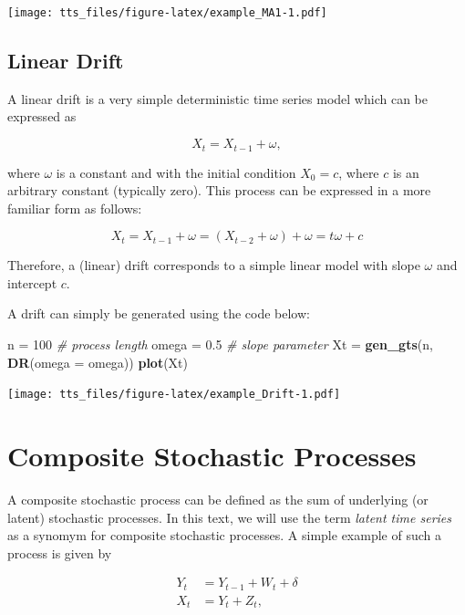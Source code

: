 \documentclass[]{book}
\newenvironment{Shaded}{\begin{snugshade}}{\end{snugshade}}
\newcommand{\CommentTok}[1]{\textcolor[rgb]{0.56,0.35,0.01}{\textit{#1}}}
\newcommand{\DataTypeTok}[1]{\textcolor[rgb]{0.13,0.29,0.53}{#1}}
\newcommand{\DecValTok}[1]{\textcolor[rgb]{0.00,0.00,0.81}{#1}}
\newcommand{\FloatTok}[1]{\textcolor[rgb]{0.00,0.00,0.81}{#1}}
\newcommand{\KeywordTok}[1]{\textcolor[rgb]{0.13,0.29,0.53}{\textbf{#1}}}
\newcommand{\NormalTok}[1]{#1}
\newcommand{\StringTok}[1]{\textcolor[rgb]{0.31,0.60,0.02}{#1}}
\theoremstyle{definition}
\theoremstyle{definition}
\theoremstyle{definition}
\theoremstyle{remark}
\begin{document}
\texttt{[image: tts\_files/figure-latex/example\_MA1-1.pdf]}

\hypertarget{drift}{%
\subsection{Linear Drift}\label{drift}}

A linear drift is a very simple deterministic time series model which
can be expressed as

\[X_t = X_{t-1} + \omega, \]

where \(\omega\) is a constant and with the initial condition
\(X_0 = c\), where \(c\) is an arbitrary constant (typically zero). This
process can be expressed in a more familiar form as follows:

\[
  {X_t} = {X_{t - 1}} + \omega 
   = \left( {{X_{t - 2}} + \omega} \right) + \omega 
   = t{\omega} + c  \]

Therefore, a (linear) drift corresponds to a simple linear model with
slope \(\omega\) and intercept \(c\).

A drift can simply be generated using the code below:

\begin{Shaded}
\begin{Highlighting}[]
\NormalTok{n =}\StringTok{ }\DecValTok{100}                               \CommentTok{# process length}
\NormalTok{omega =}\StringTok{ }\FloatTok{0.5}                           \CommentTok{# slope parameter}
\NormalTok{Xt =}\StringTok{ }\KeywordTok{gen_gts}\NormalTok{(n, }\KeywordTok{DR}\NormalTok{(}\DataTypeTok{omega =}\NormalTok{ omega))}
\KeywordTok{plot}\NormalTok{(Xt)}
\end{Highlighting}
\end{Shaded}

\texttt{[image: tts\_files/figure-latex/example\_Drift-1.pdf]}

\hypertarget{lts}{%
\section{Composite Stochastic Processes}\label{lts}}

A composite stochastic process can be defined as the sum of underlying
(or latent) stochastic processes. In this text, we will use the term
\emph{latent time series} as a synomym for composite stochastic
processes. A simple example of such a process is given by

\[\begin{aligned}
Y_t &= Y_{t-1} + W_t + \delta\\
X_t &= Y_t + Z_t,
\end{aligned}\]
\end{document}
